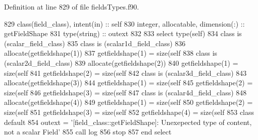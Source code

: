 Definition at line 829 of file fields\+Types.\+f90.


\begin{DoxyCode}
829     \textcolor{keywordtype}{class}(field\_class), \textcolor{keywordtype}{intent(in)} :: self
830     \textcolor{keywordtype}{integer}, \textcolor{keywordtype}{allocatable}, \textcolor{keywordtype}{dimension(:)} :: getFieldShape
831     \textcolor{keywordtype}{type}(string) :: outext
832 
833     \textcolor{keywordflow}{select type}(self)
834 \textcolor{keywordflow}{    class is} (scalar\_field\_class)
835 \textcolor{keywordflow}{    class is} (scalar1d\_field\_class)
836         \textcolor{keyword}{allocate}(getfieldshape(1))
837         getfieldshape(1) = \textcolor{keyword}{size}(self%
838 \textcolor{keywordflow}{    class is} (scalar2d\_field\_class)
839         \textcolor{keyword}{allocate}(getfieldshape(2))
840         getfieldshape(1) = \textcolor{keyword}{size}(self%
841         getfieldshape(2) = \textcolor{keyword}{size}(self%
842 \textcolor{keywordflow}{    class is} (scalar3d\_field\_class)
843         \textcolor{keyword}{allocate}(getfieldshape(3))
844         getfieldshape(1) = \textcolor{keyword}{size}(self%
845         getfieldshape(2) = \textcolor{keyword}{size}(self%
846         getfieldshape(3) = \textcolor{keyword}{size}(self%
847 \textcolor{keywordflow}{    class is} (scalar4d\_field\_class)
848         \textcolor{keyword}{allocate}(getfieldshape(4))
849         getfieldshape(1) = \textcolor{keyword}{size}(self%
850         getfieldshape(2) = \textcolor{keyword}{size}(self%
851         getfieldshape(3) = \textcolor{keyword}{size}(self%
852         getfieldshape(4) = \textcolor{keyword}{size}(self%
853 \textcolor{keywordflow}{        class default}
854         outext = \textcolor{stringliteral}{'[field\_class::getFieldShape]: Unexepected type of content, not a scalar Field'}
855         \textcolor{keyword}{call }log%
856         stop
857 \textcolor{keywordflow}{    end select}
\end{DoxyCode}
\mbox{\label{namespacefieldtypes__mod_ac35041b0ab166699a4fda1d0fa02ec67}} 
